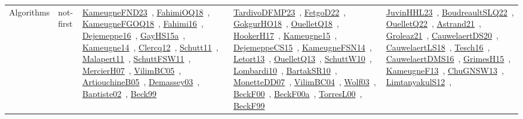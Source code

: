 {\begin{longtable}{lp{3cm}>{\raggedright\arraybackslash}p{6cm}>{\raggedright\arraybackslash}p{6cm}>{\raggedright\arraybackslash}p{8cm}}
\index{not-first}\index{Algorithms!not-first}Algorithms & not-first & \href{../works/KameugneFND23.pdf}{KameugneFND23}~\cite{KameugneFND23}, \href{../works/FahimiOQ18.pdf}{FahimiOQ18}~\cite{FahimiOQ18}, \href{../works/KameugneFGOQ18.pdf}{KameugneFGOQ18}~\cite{KameugneFGOQ18}, \href{../works/Fahimi16.pdf}{Fahimi16}~\cite{Fahimi16}, \href{../works/Dejemeppe16.pdf}{Dejemeppe16}~\cite{Dejemeppe16}, \href{../works/GayHS15a.pdf}{GayHS15a}~\cite{GayHS15a}, \href{../works/Kameugne14.pdf}{Kameugne14}~\cite{Kameugne14}, \href{../works/Clercq12.pdf}{Clercq12}~\cite{Clercq12}, \href{../works/Schutt11.pdf}{Schutt11}~\cite{Schutt11}, \href{../works/Malapert11.pdf}{Malapert11}~\cite{Malapert11}, \href{../works/SchuttFSW11.pdf}{SchuttFSW11}~\cite{SchuttFSW11}, \href{../works/MercierH07.pdf}{MercierH07}~\cite{MercierH07}, \href{../works/VilimBC05.pdf}{VilimBC05}~\cite{VilimBC05}, \href{../works/ArtiouchineB05.pdf}{ArtiouchineB05}~\cite{ArtiouchineB05}, \href{../works/Demassey03.pdf}{Demassey03}~\cite{Demassey03}, \href{../works/Baptiste02.pdf}{Baptiste02}~\cite{Baptiste02}, \href{../works/Beck99.pdf}{Beck99}~\cite{Beck99} & \href{../works/TardivoDFMP23.pdf}{TardivoDFMP23}~\cite{TardivoDFMP23}, \href{../works/FetgoD22.pdf}{FetgoD22}~\cite{FetgoD22}, \href{../works/GokgurHO18.pdf}{GokgurHO18}~\cite{GokgurHO18}, \href{../works/OuelletQ18.pdf}{OuelletQ18}~\cite{OuelletQ18}, \href{../works/HookerH17.pdf}{HookerH17}~\cite{HookerH17}, \href{../works/Kameugne15.pdf}{Kameugne15}~\cite{Kameugne15}, \href{../works/DejemeppeCS15.pdf}{DejemeppeCS15}~\cite{DejemeppeCS15}, \href{../works/KameugneFSN14.pdf}{KameugneFSN14}~\cite{KameugneFSN14}, \href{../works/Letort13.pdf}{Letort13}~\cite{Letort13}, \href{../works/OuelletQ13.pdf}{OuelletQ13}~\cite{OuelletQ13}, \href{../works/SchuttW10.pdf}{SchuttW10}~\cite{SchuttW10}, \href{../works/Lombardi10.pdf}{Lombardi10}~\cite{Lombardi10}, \href{../works/BartakSR10.pdf}{BartakSR10}~\cite{BartakSR10}, \href{../works/MonetteDD07.pdf}{MonetteDD07}~\cite{MonetteDD07}, \href{../works/VilimBC04.pdf}{VilimBC04}~\cite{VilimBC04}, \href{../works/Wolf03.pdf}{Wolf03}~\cite{Wolf03}, \href{../works/BeckF00.pdf}{BeckF00}~\cite{BeckF00}, \href{../works/BeckF00a.pdf}{BeckF00a}~\cite{BeckF00a}, \href{../works/TorresL00.pdf}{TorresL00}~\cite{TorresL00}, \href{../works/BeckF99.pdf}{BeckF99}~\cite{BeckF99} & \href{../works/JuvinHHL23.pdf}{JuvinHHL23}~\cite{JuvinHHL23}, \href{../works/BoudreaultSLQ22.pdf}{BoudreaultSLQ22}~\cite{BoudreaultSLQ22}, \href{../works/OuelletQ22.pdf}{OuelletQ22}~\cite{OuelletQ22}, \href{../works/Astrand21.pdf}{Astrand21}~\cite{Astrand21}, \href{../works/Groleaz21.pdf}{Groleaz21}~\cite{Groleaz21}, \href{../works/CauwelaertDS20.pdf}{CauwelaertDS20}~\cite{CauwelaertDS20}, \href{../works/CauwelaertLS18.pdf}{CauwelaertLS18}~\cite{CauwelaertLS18}, \href{../works/Tesch16.pdf}{Tesch16}~\cite{Tesch16}, \href{../works/CauwelaertDMS16.pdf}{CauwelaertDMS16}~\cite{CauwelaertDMS16}, \href{../works/GrimesH15.pdf}{GrimesH15}~\cite{GrimesH15}, \href{../works/KameugneF13.pdf}{KameugneF13}~\cite{KameugneF13}, \href{../works/ChuGNSW13.pdf}{ChuGNSW13}~\cite{ChuGNSW13}, \href{../works/LimtanyakulS12.pdf}{LimtanyakulS12}~\cite{LimtanyakulS12}, 
\end{longtable}}
